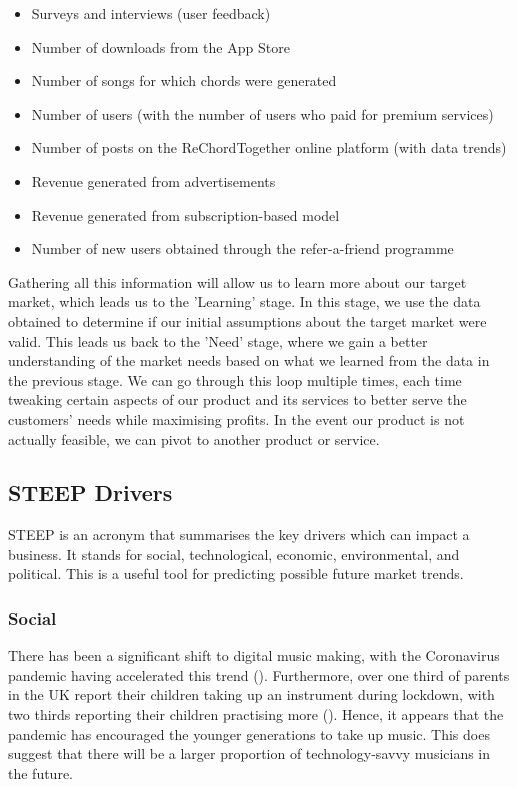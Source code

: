 \begin{itemize}
    \item Surveys and interviews (user feedback)
    \item Number of downloads from the App Store
    \item Number of songs for which chords were generated
    \item Number of users (with the number of users who paid for premium services)
    \item Number of posts on the ReChordTogether online platform (with data trends)
    \item Revenue generated from advertisements
    \item Revenue generated from subscription-based model
    \item Number of new users obtained through the refer-a-friend programme
  \end{itemize}

  Gathering all this information will allow us to learn more about our target market, which leads us to the 'Learning' stage. In this stage, we use the data obtained to determine if our initial assumptions about the target market were valid. This leads us back to the 'Need' stage, where we gain a better understanding of the market needs based on what we learned from the data in the previous stage. We can go through this loop multiple times, each time tweaking certain aspects of our product and its services to better serve the customers' needs while maximising profits. In the event our product is not actually feasible, we can pivot to another product or service.

  \subsection{STEEP Drivers}
  \label{STEEP Drivers}

  STEEP is an acronym that summarises the key drivers which can impact a business. It stands for social, technological, economic, environmental, and political. This is a useful tool for predicting possible future market trends.

  \subsubsection{Social}
  There has been a significant shift to digital music making, with the Coronavirus pandemic having accelerated this trend (\cite{abrsm2021}). Furthermore, over one third of parents in the UK report their children taking up an instrument during lockdown, with two thirds reporting their children practising more (\cite{abrsm2021}). Hence, it appears that the pandemic has encouraged the younger generations to take up music. This does suggest that there will be a larger proportion of technology-savvy musicians in the future.


